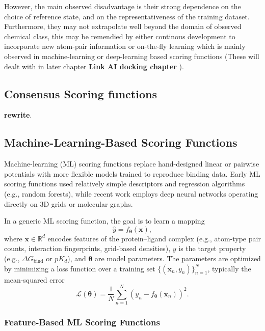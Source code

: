 \documentclass[12pt]{article}
\begin{document}
However, the main observed disadvantage is their strong dependence on the choice of reference state, and on the representativeness of the training dataset. Furthermore, they may not extrapolate well beyond the domain of observed chemical class, this may be remendied by either continous development to incorporate new atom-pair information or on-the-fly learning which is mainly observed in machine-learning or deep-learning based scoring functions (These will dealt with in later chapter \textbf{Link AI docking chapter} ).

\subsection{Consensus Scoring functions}
\textbf{rewrite}.\cite{CH3_Wang2017}


\subsection{Machine-Learning-Based Scoring Functions}

Machine-learning (ML) scoring functions replace hand-designed linear or pairwise potentials with more flexible models trained to reproduce binding data. Early ML scoring functions used relatively simple descriptors and regression algorithms (e.g., random forests), while recent work employs deep neural networks operating directly on 3D grids or molecular graphs.\cite{CH3_Ballester2010_RFScore,CH3_Wojcikowski2017_RFScoreVS,CH3_Jimenez2018_KDEEP}

In a generic ML scoring function, the goal is to learn a mapping
\begin{equation}
\hat{y} = f_{\boldsymbol{\theta}}(\mathbf{x}),
\end{equation}
where $\mathbf{x} \in \mathbb{R}^d$ encodes features of the protein--ligand complex (e.g., atom-type pair counts, interaction fingerprints, grid-based densities), $y$ is the target property (e.g., $\Delta G_{\text{bind}}$ or $pK_d$), and $\boldsymbol{\theta}$ are model parameters. The parameters are optimized by minimizing a loss function over a training set $\{(\mathbf{x}_n, y_n)\}_{n=1}^N$, typically the mean-squared error
\begin{equation}
\mathcal{L}(\boldsymbol{\theta}) = \frac{1}{N} \sum_{n=1}^N \left( y_n - f_{\boldsymbol{\theta}}(\mathbf{x}_n) \right)^2.
\end{equation}

\subsubsection{Feature-Based ML Scoring Functions}
\end{document}
